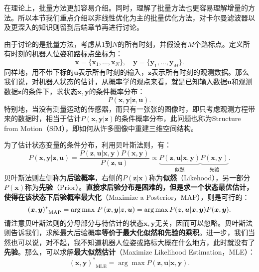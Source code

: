 在理论上，批量方法更加容易介绍。同时，理解了批量方法也更容易理解增量的方法。所以本节我们重点介绍以非线性优化为主的批量优化方法，对卡尔曼滤波器以及更深入的知识则留到后端章节再进行讨论。

由于讨论的是批量方法，考虑从1到$N$的所有时刻，并假设有$M$个路标点。定义所有时刻的机器人位姿和路标点坐标为：
\[
\bm{x}=\{ \bm{x}_1, \ldots, \bm{x}_N \}, \quad \bm{y} = \{\bm{y}_1, \ldots, \bm{y}_M \}.
\]
同样地，用不带下标的$\bm{u}$表示所有时刻的输入，$\bm{z}$表示所有时刻的观测数据。那么我们说，对机器人状态的估计，从概率学的观点来看，就是已知输入数据$\bm{u}$和观测数据$\bm{z}$的条件下，求状态$\bm{x},\bm{y}$的条件概率分布：
\begin{equation}
P( \bm{x},\bm{y} | \bm{z}, \bm{u}).
\end{equation}
特别地，当没有测量运动的传感器，而只有一张张的图像时，即只考虑观测方程带来的数据时，相当于估计$P( \bm{x},\bm{y} | \bm{z} )$的条件概率分布，此问题也称为Structure from Motion（SfM），即如何从许多图像中重建三维空间结构\textsuperscript{\cite{Agarwal2009}}。

为了估计状态变量的条件分布，利用贝叶斯法则，有：
\begin{equation}
P\left( { \bm{x},\bm{y}| \bm{z}, \bm{u}} \right) = \frac{{P\left( {\bm{z},\bm{u}|\bm{x},\bm{y}} \right)P\left( \bm{x}, \bm{y} \right)}}{{P\left( \bm{z},\bm{u}\right)}} \propto \underbrace{P\left(  { \bm{z},\bm{u}| \bm{x},\bm{y} } \right)}_{\text{似然}} \underbrace{P\left( \bm{x},\bm{y} \right)}_{\text{先验}}.
\end{equation}
贝叶斯法则左侧称为\textbf{后验概率}，右侧的$P(\bm{z}|\bm{x})$称为\textbf{似然}（Likehood），另一部分$P(\bm{x})$称为\textbf{先验}（Prior）。\textbf{直接求后验分布是困难的，但是求一个状态最优估计，使得在该状态下后验概率最大化}（Maximize a Posterior，MAP），则是可行的：
\begin{equation}
{(\bm{x},\bm{y})^*}_{\mathrm{MAP}} = \arg {\mathop{\rm max}\nolimits}\  P \left( {\bm{x},\bm{y}|\bm{z},\bm{u}} \right) = \arg \max P(\bm{z},\bm{u}|\bm{x},\bm{y})P(\bm{x},\bm{y}).
\end{equation}
请注意贝叶斯法则的分母部分与待估计的状态$\bm{x},\bm{y}$无关，因而可以忽略。贝叶斯法则告诉我们，求解最大后验概率\textbf{等价于最大化似然和先验的乘积}。进一步，我们当然也可以说，对不起，我不知道机器人位姿或路标大概在什么地方，此时就没有了\textbf{先验}。那么，可以求解\textbf{最大似然估计}（Maximize Likelihood Estimation，MLE）：
\begin{equation}
{ (\bm{x},\bm{y})^*}_{\mathrm{MLE}} = \arg \max P( \bm{z},\bm{u}| \bm{x},\bm{y}).
\end{equation}


